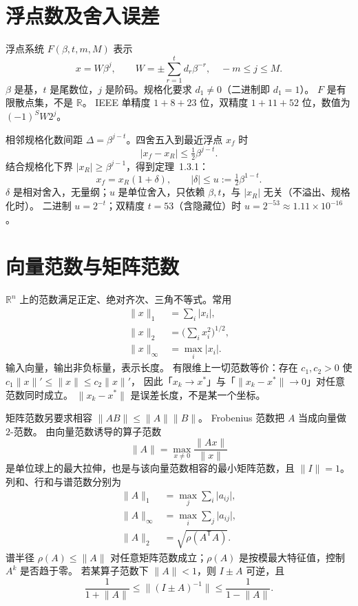 \section{浮点数及舍入误差}

浮点系统 $F(\beta,t,m,M)$ 表示
\[
x=W\beta^j,
\qquad
W=\pm\sum_{r=1}^{t}d_r\beta^{-r},
\quad -m\le j\le M.
\]
$\beta$ 是基，$t$ 是尾数位，$j$ 是阶码。规格化要求 $d_1\neq 0$（二进制即 $d_1=1$）。
$F$ 是有限散点集，不是 $\mathbb{R}$。
IEEE 单精度 $1+8+23$ 位，双精度 $1+11+52$ 位，数值为 $(-1)^S W 2^j$。

相邻规格化数间距 $\Delta=\beta^{j-t}$。四舍五入到最近浮点 $x_f$ 时
\[
\lvert x_f-x_R\rvert\le\tfrac12\beta^{j-t}.
\]
结合规格化下界 $\lvert x_R\rvert\ge\beta^{j-1}$，得到定理~1.3.1：
\begin{equation}
x_f=x_R(1+\delta),
\qquad
\lvert\delta\rvert\le u:=\tfrac12\beta^{1-t}.
\end{equation}
$\delta$ 是相对舍入，无量纲；$u$ 是单位舍入，只依赖 $\beta,t$，与 $\lvert x_R\rvert$ 无关（不溢出、规格化时）。
二进制 $u=2^{-t}$；双精度 $t=53$（含隐藏位）时 $u=2^{-53}\approx 1.11\times 10^{-16}$。


\section{向量范数与矩阵范数}

$\mathbb{R}^n$ 上的范数满足正定、绝对齐次、三角不等式。常用
\begin{align}
\lVert x\rVert_1&=\sum_i\lvert x_i\rvert,\\
\lVert x\rVert_2&=\bigl(\sum_i x_i^2\bigr)^{1/2},\\
\lVert x\rVert_\infty&=\max_i\lvert x_i\rvert.
\end{align}
输入向量，输出非负标量，表示长度。
有限维上一切范数等价：存在 $c_1,c_2>0$ 使 $c_1\lVert x\rVert'\le\lVert x\rVert\le c_2\lVert x\rVert'$，
因此「$x_k\to x^*$」与「$\lVert x_k-x^*\rVert\to 0$」对任意范数同时成立。
$\lVert x_k-x^*\rVert$ 是误差长度，不是某一个坐标。

矩阵范数另要求相容 $\lVert AB\rVert\le\lVert A\rVert\lVert B\rVert$。
Frobenius 范数把 $A$ 当成向量做 $2$-范数。
由向量范数诱导的算子范数
\[
\lVert A\rVert=\max_{x\neq 0}\frac{\lVert Ax\rVert}{\lVert x\rVert}
\]
是单位球上的最大拉伸，也是与该向量范数相容的最小矩阵范数，且 $\lVert I\rVert=1$。
列和、行和与谱范数分别为
\begin{align}
\lVert A\rVert_1&=\max_j\sum_i\lvert a_{ij}\rvert,\\
\lVert A\rVert_\infty&=\max_i\sum_j\lvert a_{ij}\rvert,\\
\lVert A\rVert_2&=\sqrt{\rho(A^{\mathsf T}A)}.
\end{align}
谱半径 $\rho(A)\le\lVert A\rVert$ 对任意矩阵范数成立；$\rho(A)$ 是按模最大特征值，控制 $A^k$ 是否趋于零。
若某算子范数下 $\lVert A\rVert<1$，则 $I\pm A$ 可逆，且
\[
\frac{1}{1+\lVert A\rVert}\le\lVert(I\pm A)^{-1}\rVert\le\frac{1}{1-\lVert A\rVert}.
\]

